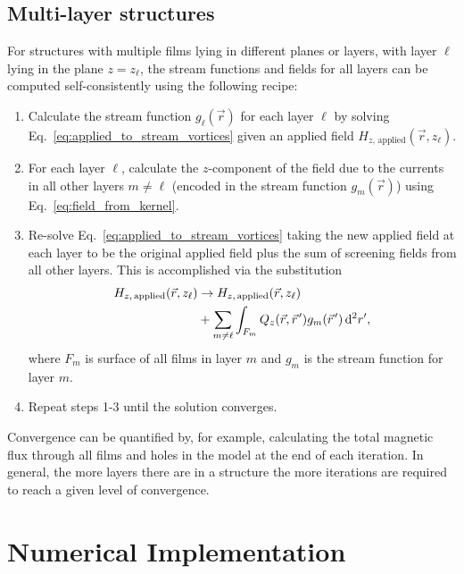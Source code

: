 \documentclass[final,3p,times,twocolumn]{elsarticle}
\newcommand{\pvec}[1]{\vec{#1}\mkern2mu\vphantom{#1}}
\begin{document}
\subsection{Multi-layer structures}
\label{section:model:multilayer}

For structures with multiple films lying in different planes or layers, with layer $\ell$ lying in the plane $z=z_\ell$,
the stream functions and fields for all layers can be computed self-consistently using the following recipe:

\begin{enumerate}
    \item{
        Calculate the stream function $g_\ell(\vec{r})$ for each layer $\ell$ by solving Eq.~\ref{eq:applied_to_stream_vortices} given an applied field $H_{z,\,\mathrm{applied}}(\vec{r}, z_\ell)$.
    }
    \item{
        For each layer $\ell$, calculate the $z$-component of the field due to the currents in all other layers $m\neq\ell$ (encoded in the stream function $g_m(\vec{r})$)
        using Eq.~\ref{eq:field_from_kernel}.
    }
    \item{
        Re-solve Eq.~\ref{eq:applied_to_stream_vortices} taking the new applied field at each layer to be the original applied field plus the sum of screening fields from all other layers. This is accomplished via the substitution
        \begin{align}
        \begin{split}
            H_{z,\,\mathrm{applied}}(\vec{r}, z_\ell)
            &\to H_{z,\,\mathrm{applied}}(\vec{r}, z_\ell)\\
            &+ \sum_{m\neq\ell}
            \int_{F_m} Q_z(\vec{r},\pvec{r}')g_m(\pvec{r}')\,\mathrm{d}^2r',
            \label{eq:iterative}
        \end{split}
        \end{align}
        where $F_m$ is surface of all films in layer $m$ and $g_m$ is the stream function for layer $m$.
    }
    \item{
        Repeat steps 1-3 until the solution converges.
    }
\end{enumerate}

Convergence can be quantified by, for example, calculating the total magnetic flux through all films and holes in the model at the end of each iteration. In general, the more layers there are in a structure the more iterations are  required to reach a given level of convergence.

\section{Numerical Implementation}
\label{section:implementation}
\end{document}
